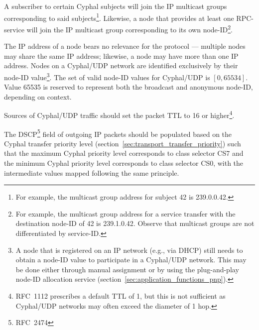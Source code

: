 A subscriber to certain Cyphal subjects will join the IP multicast groups corresponding to said subjects\footnote{%
    For example, the multicast group address for subject 42 is 239.0.0.42.
}.
Likewise, a node that provides at least one RPC-service will join the IP multicast group corresponding to
its own node-ID\footnote{%
    For example, the multicast group address for a service transfer with the destination node-ID of 42 is 239.1.0.42.
    Observe that multicast groups are not differentiated by service-ID.
}.

The IP address of a node bears no relevance for the protocol ---
multiple nodes may share the same IP address; likewise, a node may have more than one IP address.
Nodes on a Cyphal/UDP network are identified exclusively by their node-ID value\footnote{%
    A node that is registered on an IP network (e.g., via DHCP)
    still needs to obtain a node-ID value to participate in a Cyphal/UDP network.
    This may be done either through manual assignment or by using the plug-and-play node-ID allocation service
    (section~\ref{sec:application_functions_pnp}).
}.
The set of valid node-ID values for Cyphal/UDP is $[0, 65534]$.
Value 65535 is reserved to represent both the broadcast and anonymous node-ID, depending on context.

Sources of Cyphal/UDP traffic should set the packet TTL to 16 or higher\footnote{%
    RFC~1112 prescribes a default TTL of 1,
    but this is not sufficient as Cyphal/UDP networks may often exceed the diameter of 1 hop.
}.

The DSCP\footnote{RFC~2474} field of outgoing IP packets
should be populated based on the Cyphal transfer priority level (section~\ref{sec:transport_transfer_priority})
such that the maximum Cyphal priority level corresponds to class selector CS7
and the minimum Cyphal priority level corresponds to class selector CS0,
with the intermediate values mapped following the same principle.

